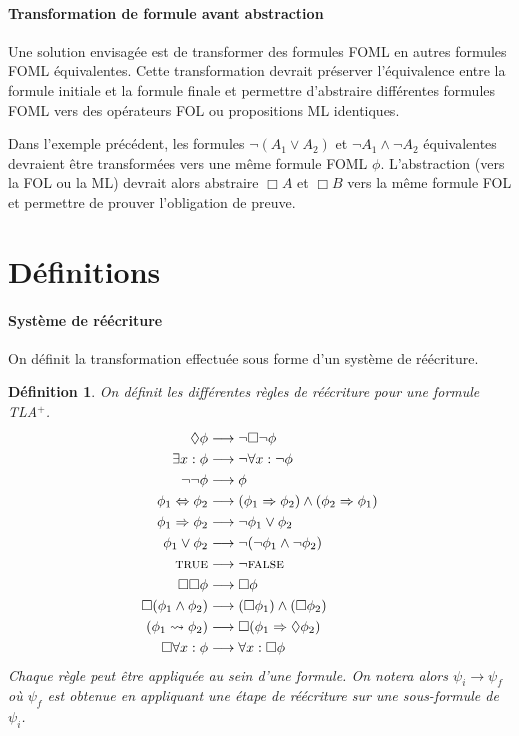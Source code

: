 \documentclass[12pt]{article}
\newcommand{\lra}{\ensuremath{\longrightarrow}}
\newcommand{\TRUE}{\textsc{true}}
\newcommand{\FALSE}{\textsc{false}}
\newtheorem{defin}{Définition}
\begin{document}
\paragraph{Transformation de formule avant abstraction}

Une solution envisagée est de transformer des formules FOML en autres formules FOML équivalentes.
Cette transformation devrait préserver l'équivalence entre la formule initiale et la formule finale et permettre d'abstraire différentes formules FOML vers des opérateurs FOL ou propositions ML identiques.

Dans l'exemple précédent, les formules $\neg (A_1 \lor A_2)$ et $\neg A_1 \land \neg A_2$ équivalentes devraient être transformées vers une même formule FOML $\phi$.
L'abstraction (vers la FOL ou la ML) devrait alors abstraire $\Box A$ et $\Box B$ vers la même formule FOL et permettre de prouver l'obligation de preuve.

\section{Définitions}


\paragraph{Système de réécriture}

On définit la transformation effectuée sous forme d'un système de réécriture.

\begin{defin}
  On définit les différentes règles de réécriture pour une formule TLA$^+$.
  \begin{align*}
    \Diamond \phi & \longrightarrow \neg \Box \neg \phi \\
    \exists x : \phi & \longrightarrow \neg \forall x : \neg \phi \\
    \neg \neg \phi & \longrightarrow \phi \\
    \phi_1 \Leftrightarrow \phi_2 & \longrightarrow (\phi_1 \Rightarrow \phi_2) \land (\phi_2 \Rightarrow \phi_1) \\
    \phi_1 \Rightarrow \phi_2 & \longrightarrow \neg \phi_1 \lor \phi_2 \\
    \phi_1 \lor \phi_2 & \longrightarrow \neg(\neg \phi_1 \land \neg \phi_2) \\
    \TRUE & \longrightarrow \neg \FALSE \\
    \Box \Box \phi & \longrightarrow \Box \phi \\
    \Box (\phi_1 \land \phi_2) & \lra (\Box \phi_1) \land (\Box \phi_2) \\
    (\phi_1 \leadsto \phi_2) & \lra \Box (\phi_1 \Rightarrow \Diamond \phi_2) \\
    \Box \forall x : \phi & \lra \forall x : \Box \phi
  \end{align*}
  Chaque règle peut être appliquée au sein d'une formule.
  On notera alors \( \psi_i \longrightarrow \psi_f \) où \(\psi_f\) est obtenue en appliquant une étape de réécriture sur une sous-formule de \(\psi_i\).
\end{defin}
\end{document}
